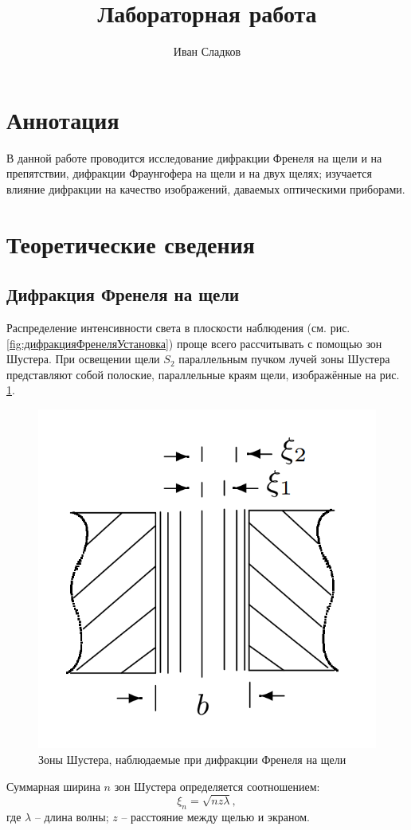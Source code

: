 \documentclass[a4paper]{article}
\title{Лабораторная работа \labnum \space \labname} %
\author{Иван Сладков}
\newcommand{\picref}[1]{рис. \ref{#1}}
\begin{document}
\maketitle
\thispagestyle{empty}
\section{Аннотация}
В данной работе проводится исследование дифракции Френеля на щели и на препятствии, дифракции Фраунгофера на щели и на двух щелях; изучается влияние дифракции на качество изображений, даваемых оптическими приборами.

\section{Теоретические сведения}

\subsection{Дифракция Френеля на щели}

Распределение интенсивности света в плоскости наблюдения (см. \picref{fig:дифракцияФренеляУстановка}) проще всего рассчитывать с помощью зон Шустера. При освещении щели $ S_2 $ параллельным пучком лучей зоны Шустера представляют собой полоские, параллельные краям щели, изображённые на \picref{fig:ШустерЗоны}. 

\begin{figure}[tbp]
	\centering
	\includegraphics[width=0.5\linewidth]{Screenshot_1}
	\caption{Зоны Шустера, наблюдаемые при дифракции Френеля на щели}
	\label{fig:ШустерЗоны}
\end{figure}

Суммарная ширина $ n $ зон Шустера определяется соотношением:
\begin{equation}\label{eq:шустерзоны}
	\xi_n = \sqrt{n z \lambda},
\end{equation}
где $ \lambda $ -- длина волны; $ z $ -- расстояние между щелью и экраном.
\end{document}
